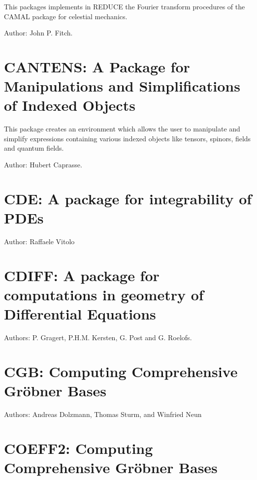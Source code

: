 This packages implements in REDUCE the Fourier transform procedures of the
CAMAL package for celestial mechanics.

Author: John P. Fitch.



\newpage

\section{CANTENS: A Package for Manipulations 
and Simplifications of Indexed Objects}


This package creates an environment which allows the user to
manipulate and simplify expressions containing various indexed objects
like tensors, spinors, fields and quantum fields.

Author: Hubert Caprasse.



\newpage

\section{CDE: A package for integrability of PDEs}

Author: Raffaele Vitolo



\newpage

\section{CDIFF: A package for computations in geometry
  of Differential Equations}
\label{CDIFF}


Authors: P. Gragert, P.H.M. Kersten, G. Post and G. Roelofs.



\newpage

\section{CGB: Computing Comprehensive Gr\"obner Bases}

Authors: Andreas Dolzmann, Thomas Sturm, and Winfried Neun



\newpage

\section{COEFF2: Computing Comprehensive Gr\"obner Bases}


